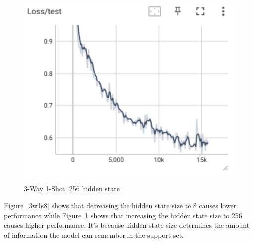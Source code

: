 \documentclass[12pt]{article}
\begin{document}
\begin{enumerate}[label=\alph*]
\begin{figure}[htbp]
\begin{minipage}{0.4\linewidth}
		\includegraphics[width=0.9\linewidth]{./figures/3w1s256_test_loss.png}
		\label{pic three}%
	\end{minipage}
    \caption{3-Way 1-Shot, 256 hidden state}
    \label{3w1s256}
    \end{figure}

    \newline
    Figure~\ref{3w1s8} shows that decreasing the hidden state size to 8 causes lower performance while Figure~\ref{3w1s256} shows that increasing the hidden state size to 256 causes higher performance. It's because hidden state size determines the amount of information the model can remember in the support set.
    
\end{enumerate}


\newpage


\end{document}
